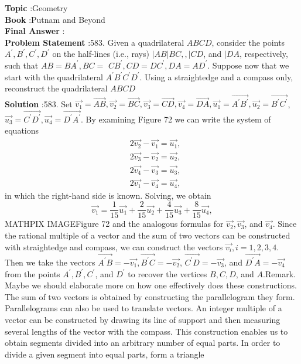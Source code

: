 \documentclass[10pt]{article}
\begin{document}
\textbf{Topic} :Geometry\\
\textbf{Book} :Putnam and Beyond\\
\textbf{Final Answer} :\\


\textbf{Problem Statement} :583. Given a quadrilateral $A B C D$, consider the points $A^{\prime}, B^{\prime}, C^{\prime}, D^{\prime}$ on the half-lines (i.e., rays) $|A B| B C,, \mid C D$, and $\mid D A$, respectively, such that $A B=B A^{\prime}, B C=$ $C B^{\prime}, C D=D C^{\prime}, D A=A D^{\prime}$. Suppose now that we start with the quadrilateral $A^{\prime} B^{\prime} C^{\prime} D^{\prime}$. Using a straightedge and a compass only, reconstruct the quadrilateral $A B C D$ \\
\textbf{Solution} :583. Set $\overrightarrow{v_{1}}=\overrightarrow{A B}, \overrightarrow{v_{2}}=\overrightarrow{B C}, \overrightarrow{v_{3}}=\overrightarrow{C D}, \overrightarrow{v_{4}}=\overrightarrow{D A}, \overrightarrow{u_{1}}=\overrightarrow{A^{\prime} B^{\prime}}, \overrightarrow{u_{2}}=\overrightarrow{B^{\prime} C^{\prime}}$, $\overrightarrow{u_{3}}=\overrightarrow{C^{\prime} D^{\prime}}, \overrightarrow{u_{4}}=\overrightarrow{D^{\prime} A^{\prime}}$. By examining Figure 72 we can write the system of equations$$ \begin{aligned} &2 \overrightarrow{v_{2}}-\overrightarrow{v_{1}}=\overrightarrow{u_{1}}, \\ &2 \overrightarrow{v_{3}}-\overrightarrow{v_{2}}=\overrightarrow{u_{2}}, \\ &2 \overrightarrow{v_{4}}-\overrightarrow{v_{3}}=\overrightarrow{u_{3}}, \\ &2 \overrightarrow{v_{1}}-\overrightarrow{v_{4}}=\overrightarrow{u_{4}}, \end{aligned} $$in which the right-hand side is known. Solving, we obtain$$ \overrightarrow{v_{1}}=\frac{1}{15} \overrightarrow{u_{1}}+\frac{2}{15} \overrightarrow{u_{2}}+\frac{4}{15} \overrightarrow{u_{3}}+\frac{8}{15} \overrightarrow{u_{4}}, $$MATHPIX IMAGEFigure 72 and the analogous formulas for $\overrightarrow{v_{2}}, \overrightarrow{v_{3}}$, and $\overrightarrow{v_{4}}$. Since the rational multiple of a vector and the sum of two vectors can be constructed with straightedge and compass, we can construct the vectors $\overrightarrow{v_{i}}, i=1,2,3,4$. Then we take the vectors $\overrightarrow{A^{\prime} B}=-\overrightarrow{v_{1}}, \overrightarrow{B^{\prime} C}=-\overrightarrow{v_{2}}$, $\overrightarrow{C^{\prime} D}=-\overrightarrow{v_{3}}$, and $\overrightarrow{D^{\prime} A}=-\overrightarrow{v_{4}}$ from the points $A^{\prime}, B^{\prime}, C^{\prime}$, and $D^{\prime}$ to recover the vertices $B, C, D$, and $A$.Remark. Maybe we should elaborate more on how one effectively does these constructions. The sum of two vectors is obtained by constructing the parallelogram they form. Parallelograms can also be used to translate vectors. An integer multiple of a vector can be constructed by drawing its line of support and then measuring several lengths of the vector with the compass. This construction enables us to obtain segments divided into an arbitrary number of equal parts. In order to divide a given segment into equal parts, form a triangle 
\end{document}

